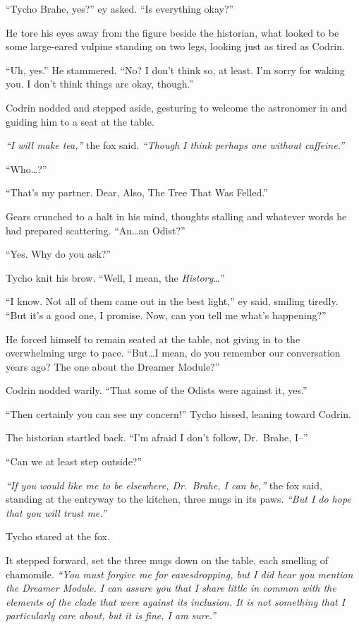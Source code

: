 ``Tycho Brahe, yes?'' ey asked. ``Is everything okay?''

He tore his eyes away from the figure beside the historian, what looked to be some large-eared vulpine standing on two legs, looking just as tired as Codrin.

``Uh, yes.'' He stammered. ``No? I don't think so, at least. I'm sorry for waking you. I don't think things are okay, though.''

Codrin nodded and stepped aside, gesturing to welcome the astronomer in and guiding him to a seat at the table.

\emph{``I will make tea,''} the fox said. \emph{``Though I think perhaps one without caffeine.''}

``Who\ldots{}?''

``That's my partner. Dear, Also, The Tree That Was Felled.''

Gears crunched to a halt in his mind, thoughts stalling and whatever words he had prepared scattering. ``An\ldots an Odist?''

``Yes. Why do you ask?''

Tycho knit his brow. ``Well, I mean, the \emph{History}\ldots{}''

``I know. Not all of them came out in the best light,'' ey said, smiling tiredly. ``But it's a good one, I promise. Now, can you tell me what's happening?''

He forced himself to remain seated at the table, not giving in to the overwhelming urge to pace. ``But\ldots I mean, do you remember our conversation years ago? The one about the Dreamer Module?''

Codrin nodded warily. ``That some of the Odists were against it, yes.''

``Then certainly you can see my concern!'' Tycho hissed, leaning toward Codrin.

The historian startled back. ``I'm afraid I don't follow, Dr.~Brahe, I--''

``Can we at least step outside?''

\emph{``If you would like me to be elsewhere, Dr.~Brahe, I can be,''} the fox said, standing at the entryway to the kitchen, three mugs in its paws. \emph{``But I do hope that you will trust me.''}

Tycho stared at the fox.

It stepped forward, set the three mugs down on the table, each smelling of chamomile. \emph{``You must forgive me for eavesdropping, but I did hear you mention the Dreamer Module. I can assure you that I share little in common with the elements of the clade that were against its inclusion. It is not something that I particularly care about, but it is fine, I am sure.''}

